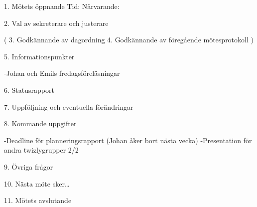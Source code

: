 1. Mötets öppnande
Tid:
Närvarande:


2. Val av sekreterare och justerare

(
3. Godkännande av dagordning
4. Godkännande av föregående mötesprotokoll
)

5. Informationspunkter

-Johan och Emils fredagsföreläsningar

6. Statusrapport

7. Uppföljning och eventuella förändringar

8. Kommande uppgifter

-Deadline för planneringsrapport (Johan åker bort nästa vecka)
-Presentation för andra twizlygrupper 2/2

9. Övriga frågor


10. Nästa möte sker…

11. Mötets avslutande
